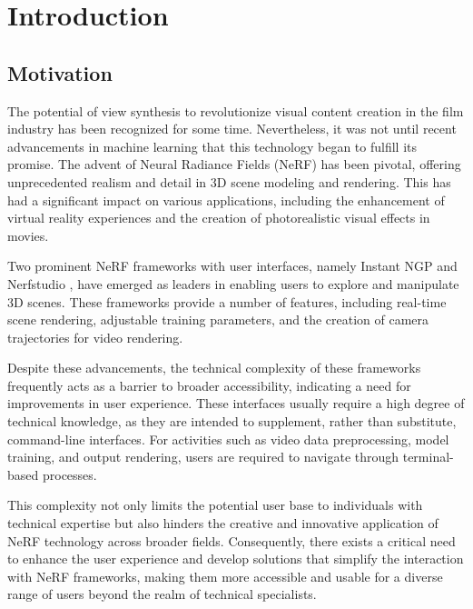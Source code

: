 %
\chapter{Introduction}
\label{sec:intro}

\section{Motivation}
\label{sec:intro:motivation}

The potential of view synthesis to revolutionize visual content creation in the film industry has been recognized for some time. Nevertheless, it was not until recent advancements in machine learning that this technology began to fulfill its promise.
The advent of Neural Radiance Fields (NeRF) has been pivotal, offering unprecedented realism and detail in 3D scene modeling and rendering.
This has had a significant impact on various applications, including the enhancement of virtual reality experiences and the creation of photorealistic visual effects in movies.

Two prominent NeRF frameworks with user interfaces, namely Instant NGP \cite{muller_instant_2022} and Nerfstudio \cite{tancik_nerfstudio_2023}, have emerged as leaders in enabling users to explore and manipulate 3D scenes. 
These frameworks provide a number of features, including real-time scene rendering, adjustable training parameters, and the creation of camera trajectories for video rendering.

Despite these advancements, the technical complexity of these frameworks frequently acts as a barrier to broader accessibility, indicating a need for improvements in user experience. 
These interfaces usually require a high degree of technical knowledge, as they are intended to supplement, rather than substitute, command-line interfaces.
For activities such as video data preprocessing, model training, and output rendering, users are required to navigate through terminal-based processes.

This complexity not only limits the potential user base to individuals with technical expertise but also hinders the creative and innovative application of NeRF technology across broader fields. 
Consequently, there exists a critical need to enhance the user experience and develop solutions that simplify the interaction with NeRF frameworks, making them more accessible and usable for a diverse range of users beyond the realm of technical specialists.


